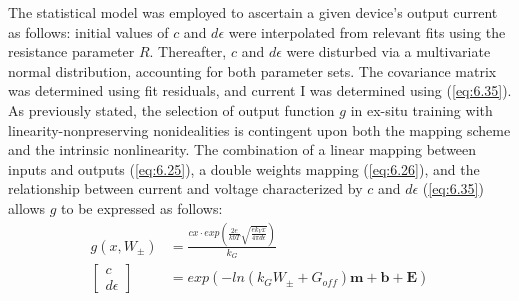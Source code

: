 
\noindent The statistical model was employed to ascertain a given device's output current as follows: initial values of $c$ and $d\epsilon$ were interpolated from relevant fits using the resistance parameter $R$. Thereafter, $c$ and $d\epsilon$ were disturbed via a multivariate normal distribution, accounting for both parameter sets. The covariance matrix was determined using fit residuals, and current I was determined using (\ref{eq:6.35}).\\


\noindent As previously stated, the selection of output function $g$ in ex-situ training with linearity-nonpreserving nonidealities is contingent upon both the mapping scheme and the intrinsic nonlinearity. The combination of a linear mapping between inputs and outputs (\ref{eq:6.25}), a double weights mapping (\ref{eq:6.26}), and the relationship between current and voltage characterized by $c$ and $d\epsilon$ (\ref{eq:6.35}) allows $g$ to be expressed as follows:
\begin{align}
g\left( x, W_\pm \right) &= \frac{cx\cdot exp\left( \frac{2e}{kbT} \sqrt{\frac{ek_Vx}{4\pi d\epsilon}} \right)}{k_G} \label{eq:6.39} \\
\begin{bmatrix} c \\  d\epsilon \end{bmatrix} &= exp\left( -ln\left( k_GW_\pm + G_{off} \right)\textbf{m} + \textbf{b} + \textbf{E} \right) \label{eq:6.40}
\end{align}

